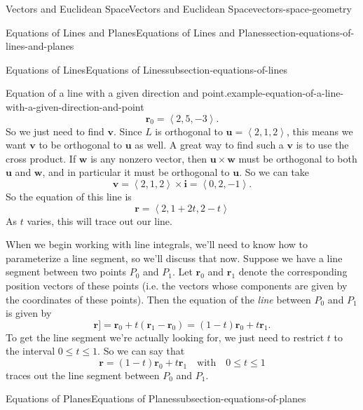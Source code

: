 \documentclass[oneside,10pt,]{book}
\numberwithin{equation}{section}
\newcommand{\vv}[1]{\mathbf{#1}}
\newcommand{\dotprod}[1]{\left\langle #1 \right\rangle}
\begin{document}
\begin{chapterptx}{Vectors and Euclidean Space}{}{Vectors and Euclidean Space}{}{}{vectors-space-geometry}
\begin{sectionptx}{Equations of Lines and Planes}{}{Equations of Lines and Planes}{}{}{section-equations-of-lines-and-planes}
\begin{subsectionptx}{Equations of Lines}{}{Equations of Lines}{}{}{subsection-equations-of-lines}
\begin{example}{Equation of a line with a given direction and point.}{example-equation-of-a-line-with-a-given-direction-and-point}
%
\begin{equation*}
\vv{r}_{0} = \dotprod{2,5,-3}.
\end{equation*}
\hypertarget{p-1209}{}%
So we just need to find \(\vv{v}\). Since \(L\) is orthogonal to \(\vv{u} = \dotprod{2,1,2}\), this means we want \(\vv{v}\) to be orthogonal to \(\vv{u}\) as well. A great way to find such a \(\vv{v}\) is to use the cross product. If \(\vv{w}\) is any nonzero vector, then \(\vv{u}\times\vv{w}\) must be orthogonal to both \(\vv{u}\) and \(\vv{w}\), and in particular it must be orthogonal to \(\vv{u}\). So we can take%
%
\begin{equation*}
\vv{v} = \dotprod{2,1,2}\times\vv{i} = \dotprod{0,2,-1}.
\end{equation*}
\hypertarget{p-1210}{}%
So the equation of this line is%
%
\begin{equation*}
\vv{r} = \dotprod{2,1+2t,2-t}
\end{equation*}
\hypertarget{p-1211}{}%
As \(t\) varies, this will trace out our line.%
\end{example}
\hypertarget{p-1212}{}%
When we begin working with line integrals, we'll need to know how to parameterize a line segment, so we'll discuss that now. Suppose we have a line segment between two points \(P_{0}\) and \(P_{1}\). Let \(\vv{r}_{0}\) and \(\vv{r}_{1}\) denote the corresponding position vectors of these points (i.e. the vectors whose components are given by the coordinates of these points). Then the equation of the \emph{line} between \(P_{0}\) and \(P_{1}\) is given by%
%
\begin{equation*}
\vv{r}] = \vv{r}_{0}+t(\vv{r}_{1}-\vv{r}_{0}) = (1-t)\vv{r}_{0}+t\vv{r}_{1}.
\end{equation*}
\hypertarget{p-1213}{}%
To get the line segment we're actually looking for, we just need to restrict \(t\) to the interval \(0\leq t\leq 1\). So we can say that%
%
\begin{equation*}
\vv{r} = (1-t)\vv{r}_{0}+t\vv{r}_{1} \quad\text{with}\quad0\leq t\leq 1
\end{equation*}
\hypertarget{p-1214}{}%
traces out the line segment between \(P_{0}\) and \(P_{1}\).%
\end{subsectionptx}
%
%
\typeout{************************************************}
\typeout{************************************************}
%
\begin{subsectionptx}{Equations of Planes}{}{Equations of Planes}{}{}{subsection-equations-of-planes}
\hypertarget{p-1215}{}%

\end{subsectionptx}
\end{sectionptx}
\end{chapterptx}
\end{document}
